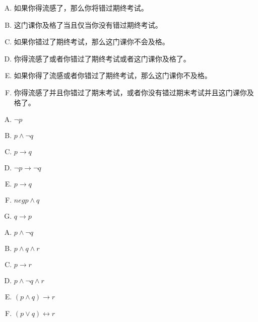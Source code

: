 {{        %
        \begin{practices}
            \begin{enumerate}[A.]
                \item 如果你得流感了，那么你将错过期终考试。
                \item 这门课你及格了当且仅当你没有错过期终考试。
                \item 如果你错过了期终考试，那么这门课你不会及格。
                \item 你得流感了或者你错过了期终考试或者这门课你及格了。
                \item 如果你得了流感或者你错过了期终考试，那么这门课你不及格。
                \item 你得流感了并且你错过了期末考试，或者你没有错过期末考试并且这门课你及格了。
            \end{enumerate}
        \end{practices}

        \begin{practices}
            \begin{enumerate}[A.]
                \item $\neg p$
                \item $p \wedge \neg q$
                \item $p \rightarrow q$
                \item $\neg p \rightarrow \neg q$
                \item $p \rightarrow q$
                \item $neg p \wedge q$
                \item $q \rightarrow p$
            \end{enumerate}
        \end{practices}

        \begin{practices}
            \begin{enumerate}[A.]
                \item $p \wedge \neg q$
                \item $p \wedge q \wedge r$
                \item $p \rightarrow r$
                \item $p \wedge \neg q \wedge r$
                \item $(p \wedge q) \rightarrow r$
                \item $(p \vee q) \leftrightarrow r$
            \end{enumerate}
        \end{practices}

}}
